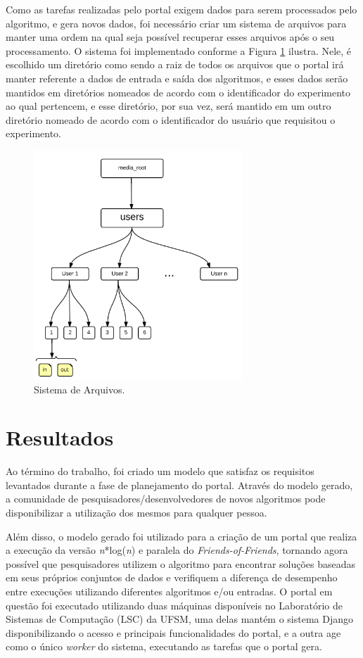 \documentclass[tg]{mdtufsm}
\begin{document}
Como as tarefas realizadas pelo portal exigem dados para serem processados pelo algoritmo, e gera novos dados, foi necessário criar um sistema de arquivos para manter uma ordem na qual seja possível recuperar esses arquivos após o seu processamento.
O sistema foi implementado conforme a Figura  \ref{fig:filesystem} ilustra. Nele, é escolhido um diretório como sendo a raiz de todos os arquivos que o portal irá manter referente a dados de entrada e saída dos algoritmos, e esses dados serão mantidos em diretórios nomeados de acordo com o identificador do experimento ao qual pertencem, e esse diretório, por sua vez, será mantido em um outro diretório nomeado de acordo com o identificador do usuário que requisitou o experimento.

\begin{figure}
	\centering
	\includegraphics[width=0.7\textwidth]{filesystem}
	\caption{
		Sistema de Arquivos.
	}
	\label{fig:filesystem}
\end{figure}

\chapter{Resultados}
Ao término do trabalho, foi criado um modelo que satisfaz os requisitos levantados durante a fase de planejamento do portal. Através do modelo gerado, a comunidade de pesquisadores/desenvolvedores de novos algoritmos pode disponibilizar a utilização dos mesmos para qualquer pessoa.

Além disso, o modelo gerado foi utilizado para a criação de um portal que realiza a execução da versão \emph{n}*log(\emph{n}) e paralela do \emph{Friends-of-Friends}, tornando agora possível que pesquisadores utilizem o algoritmo para encontrar soluções baseadas em seus próprios conjuntos de dados e verifiquem a diferença de desempenho entre execuções utilizando diferentes algoritmos e/ou entradas. O portal em questão foi executado utilizando duas máquinas disponíveis no Laboratório de Sistemas de Computação (LSC) da UFSM, uma delas mantém o sistema Django disponibilizando o acesso e principais funcionalidades do portal, e a outra age como o único \emph{worker} do sistema, executando as tarefas que o portal gera.
\end{document}
